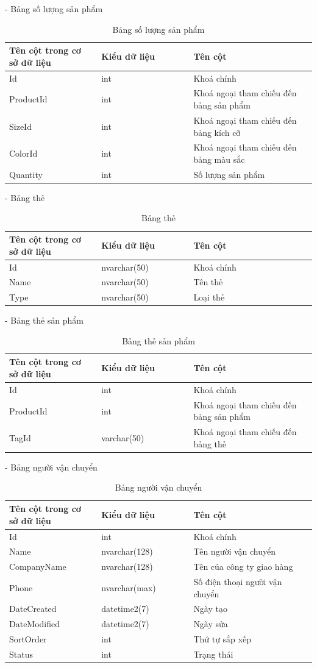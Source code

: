 - Bảng số lượng sản phẩm
\begin{longtable}[htp]{ |m{0.3\linewidth}|m{0.3\linewidth}|m{0.4\linewidth}|}
\caption{Bảng số lượng sản phẩm \label{database}}\\
\hline
Tên cột trong cơ sở dữ liệu & Kiểu dữ liệu & Tên cột  \\
\hline
Id&int&Khoá chính\\
\hline
ProductId&int&Khoá ngoại tham chiếu đến bảng sản phẩm\\
\hline
SizeId&int&Khoá ngoại tham chiếu đến bảng kích cỡ\\
\hline
ColorId&int&Khoá ngoại tham chiếu đến bảng màu sắc\\
\hline
Quantity&int&Số lượng sản phẩm\\
\hline
\end{longtable}

- Bảng thẻ 
\begin{longtable}[htp]{ |m{0.3\linewidth}|m{0.3\linewidth}|m{0.4\linewidth}|}
\caption{Bảng thẻ \label{database}}\\
\hline
Tên cột trong cơ sở dữ liệu & Kiểu dữ liệu & Tên cột  \\
\hline
Id&nvarchar(50)&Khoá chính\\
\hline
Name&nvarchar(50)&Tên thẻ\\
\hline
Type&nvarchar(50)&Loại thẻ\\
\hline
\end{longtable}

- Bảng thẻ sản phẩm
\begin{longtable}[htp]{ |m{0.3\linewidth}|m{0.3\linewidth}|m{0.4\linewidth}|}
\caption{Bảng thẻ sản phẩm \label{database}}\\
\hline
Tên cột trong cơ sở dữ liệu & Kiểu dữ liệu & Tên cột  \\
\hline
Id&int&Khoá chính\\
\hline
ProductId&int&Khoá ngoại tham chiếu đến bảng sản phẩm\\
\hline
TagId&varchar(50)&Khoá ngoại tham chiếu đến bảng thẻ\\
\hline
\end{longtable}

- Bảng người vận chuyển
\begin{longtable}[htp]{ |m{0.3\linewidth}|m{0.3\linewidth}|m{0.4\linewidth}|}
\caption{Bảng người vận chuyển \label{database}}\\
\hline
Tên cột trong cơ sở dữ liệu & Kiểu dữ liệu & Tên cột  \\
\hline
Id&int&Khoá chính\\
\hline
Name&nvarchar(128)&Tên người vận chuyển \\
\hline
CompanyName&nvarchar(128)&Tên của công ty giao hàng\\
\hline
Phone&nvarchar(max)&Số điện thoại người vận chuyển\\
\hline
DateCreated&datetime2(7)&Ngày tạo\\
\hline
DateModified&datetime2(7)&Ngày sửa\\
\hline
SortOrder&int&Thứ tự sắp xếp\\
\hline
Status&int&Trạng thái\\
\hline
\end{longtable}

